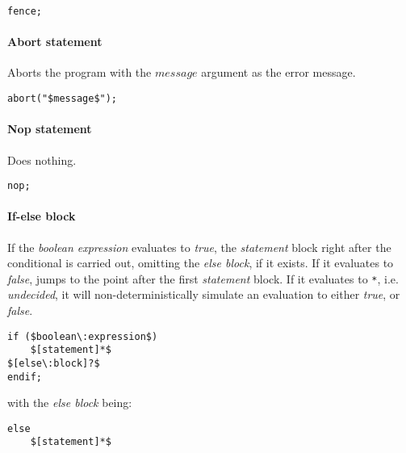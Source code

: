 \begin{lstlisting}[frame=single, mathescape]
fence;
\end{lstlisting}

\paragraph{Abort statement}
Aborts the program with the $message$ argument as the error message.

\begin{lstlisting}[frame=single, mathescape]
abort("$message$");
\end{lstlisting}

\paragraph{Nop statement}
Does nothing.

\begin{lstlisting}[frame=single, mathescape]
nop;
\end{lstlisting}

\paragraph{If-else block}
If the \emph{boolean expression} evaluates to \emph{true}, the \emph{statement} block right after the conditional is carried out, omitting the \emph{else block}, if it exists. If it evaluates to \emph{false}, jumps to the point after the first \emph{statement} block. If it evaluates to \lstinline$*$, i.e. \emph{undecided}, it will non-deterministically simulate an evaluation to either \emph{true}, or \emph{false}.

\begin{lstlisting}[frame=single, mathescape]
if ($boolean\:expression$)
	$[statement]*$
$[else\:block]?$
endif;
\end{lstlisting}

with the \emph{else block} being:

\begin{lstlisting}[frame=single, mathescape]
else
	$[statement]*$
\end{lstlisting}